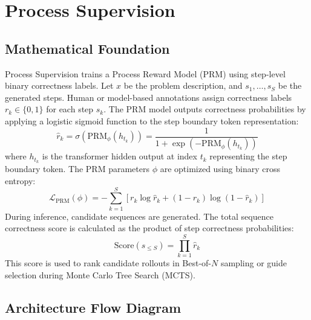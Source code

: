 \newpage
\section{Process Supervision}

\subsection{Mathematical Foundation}
Process Supervision trains a Process Reward Model (PRM) using step-level binary correctness labels. Let $x$ be the problem description, and $s_1, \dots, s_S$ be the generated steps. Human or model-based annotations assign correctness labels $r_k \in \{0, 1\}$ for each step $s_k$.
The PRM model outputs correctness probabilities by applying a logistic sigmoid function to the step boundary token representation:
\begin{equation}
  \hat{r}_k = \sigma\left( \text{PRM}_\phi(h_{t_k}) \right) = \frac{1}{1 + \exp\left( -\text{PRM}_\phi(h_{t_k}) \right)}
\end{equation}
where $h_{t_k}$ is the transformer hidden output at index $t_k$ representing the step boundary token. The PRM parameters $\phi$ are optimized using binary cross entropy:
\begin{equation}
  \mathcal{L}_{\text{PRM}}(\phi) = -\sum_{k=1}^S \left[ r_k \log \hat{r}_k + (1-r_k) \log(1 - \hat{r}_k) \right]
\end{equation}
During inference, candidate sequences are generated. The total sequence correctness score is calculated as the product of step correctness probabilities:
\begin{equation}
  \text{Score}(s_{\le S}) = \prod_{k=1}^S \hat{r}_k
\end{equation}
This score is used to rank candidate rollouts in Best-of-$N$ sampling or guide selection during Monte Carlo Tree Search (MCTS).

\subsection{Architecture Flow Diagram}

